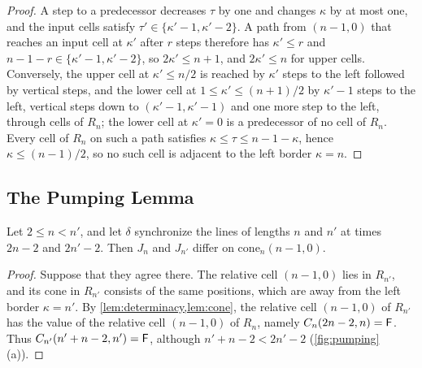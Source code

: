 \begin{proof}
A step to a predecessor decreases $\tau$ by one and changes $\kappa$ by at most
one, and the input cells satisfy $\tau'\in\{\kappa'-1,\kappa'-2\}$. A path from
$(n-1,0)$ that reaches an input cell at $\kappa'$ after $r$ steps therefore has
$\kappa'\le r$ and $n-1-r\in\{\kappa'-1,\kappa'-2\}$, so $2\kappa'\le n+1$, and
$2\kappa'\le n$ for upper cells. Conversely, the upper cell at $\kappa'\le n/2$
is reached by $\kappa'$ steps to the left followed by vertical steps, and the
lower cell at $1\le\kappa'\le(n+1)/2$ by $\kappa'-1$ steps to the left,
vertical steps down to $(\kappa'-1,\kappa'-1)$ and one more step to the left,
through cells of $R_n$; the lower cell at $\kappa'=0$ is a predecessor of no
cell of $R_n$. Every cell of $R_n$ on such a path satisfies $\kappa\le\tau\le
n-1-\kappa$, hence $\kappa\le(n-1)/2$, so no such cell is adjacent to the left
border $\kappa=n$.
\end{proof}

\subsection{The Pumping Lemma}

\begin{lemma}[pumping]\label{lem:pumping}
Let $2\le n<n'$, and let $\delta$ synchronize the lines of lengths $n$ and
$n'$ at times $2n-2$ and $2n'-2$. Then $J_n$ and $J_{n'}$ differ on
$\mathrm{cone}_n(n-1,0)$.
\end{lemma}

\begin{proof}
Suppose that they agree there. The relative cell $(n-1,0)$ lies in $R_{n'}$,
and its cone in $R_{n'}$ consists of the same positions, which are away from
the left border $\kappa=n'$. By \cref{lem:determinacy,lem:cone}, the relative
cell $(n-1,0)$ of $R_{n'}$ has the value of the relative cell $(n-1,0)$ of
$R_n$, namely $C_n(2n-2,n)=\mathsf F$. Thus $C_{n'}(n'+n-2,n')=\mathsf F$, although
$n'+n-2<2n'-2$ (\cref{fig:pumping}(a)).
\end{proof}

